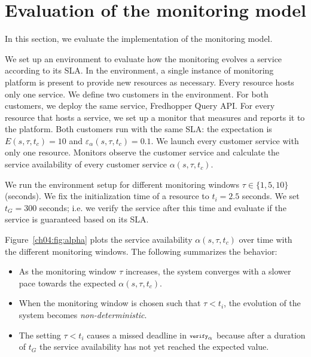 
\section{Evaluation of the monitoring model} %
\label{ch04:sec:implementation}

In this section, we evaluate the implementation of the monitoring model.

We set up an environment to evaluate how the monitoring evolves a service according to its SLA. 
In the environment, a single instance of monitoring platform is present to provide new resources as necessary.
Every resource hosts only one service.
We define two customers in the environment.
For both customers, we deploy the same service, Fredhopper Query API.
For every resource that hosts a service, we set up a monitor that measures \qps and reports it to the platform.
Both customers run with the same SLA: the \qps expectation is $E(s,\tau,t_c) = 10$ and $\varepsilon_\alpha(s,\tau,t_c) = 0.1$.
We launch every customer service with only one resource.
Monitors observe the customer service and calculate the service availability of every customer service $\alpha(s,\tau,t_c)$.

We run the environment setup for different monitoring windows $\tau \in \{1,5,10\}$ (seconds).
We fix the initialization time of a resource to $t_i = 2.5$ seconds.
We set $t_G = 300$ seconds; i.e. we verify the service after this time and evaluate if the service is guaranteed based on its SLA. 

Figure~\ref{ch04:fig:alpha} plots the service availability $\alpha(s,\tau,t_c)$ over time with the different monitoring windows.
The following summarizes the behavior:
\begin{itemize}
\item As the monitoring window $\tau$ increases, the system converges with a slower pace towards the expected $\alpha(s,\tau,t_c)$.
\item When the monitoring window is chosen such that $\tau < t_i$, the evolution of the system becomes \emph{non-deterministic}.
\item The setting $\tau < t_i$ causes a missed deadline in ${\scriptsize\texttt{verify}}_\alpha$ because after a duration of $t_G$ the service availability has not yet reached the expected value.  
\end{itemize}

